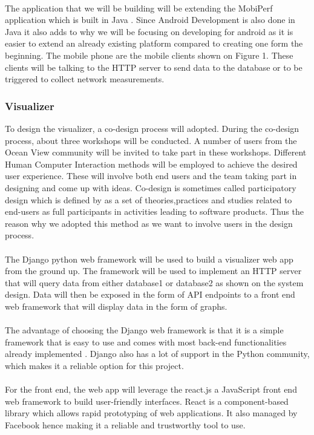 \paragraph{}
The application that we will be building will be extending the MobiPerf application which is built in Java \cite{m-lab}. Since Android Development is also done in Java it also adds to why we will be focusing on developing for android as it is easier to extend an already existing platform compared to creating one form the beginning. The mobile phone are the mobile clients shown on Figure 1. These clients will be talking to the HTTP server to send data to the database or to be triggered to collect network measurements.
\subsubsection{Visualizer}
To design the visualizer, a co-design process will adopted. During the co-design process, about three workshops  will be conducted. A number of users from the Ocean View community will be invited to take part in these workshops. Different Human Computer Interaction methods will be employed to achieve the desired user experience. These will involve both end users and the team taking part in designing and come up with ideas. Co-design is sometimes called participatory design which is defined by \cite{ctx2100202260004041} as a set of theories,practices and studies related to end-users as full participants in activities leading to software products. Thus the reason why we adopted this method as we want to involve users in the design process.
\paragraph{}
The  Django python web framework will be used to build a visualizer web app from the ground up. The framework will be used to implement an HTTP server that will query data from either database1 or database2 as shown on the system design. Data will then be exposed in the form of API endpoints to a front end web framework that will display data in the form of graphs.
\paragraph{}
The advantage of choosing the Django web framework is that it is a simple framework that is easy to use and comes with most back-end functionalities already implemented \cite{10.1007/978-3-540-87403-4_11}. Django also has a lot of support in the Python community, which makes it a reliable option for this project.
\paragraph{}
For the front end, the web app will leverage the react.js a JavaScript front end web framework to build user-friendly interfaces. React is a component-based library which allows rapid prototyping of web applications\cite{Gackenheimer2015}. It also managed by Facebook hence making it a reliable and trustworthy tool to use.
